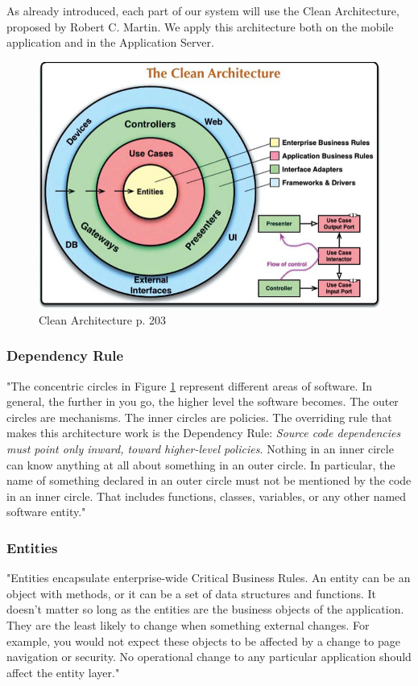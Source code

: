 As already introduced, each part of our system will use the Clean Architecture, proposed by Robert C. Martin. We apply this architecture both on the mobile application and in the Application Server.

\begin{figure}[H]
\centering
\includegraphics[width=.7\textwidth]{Images/cleanArchi.pdf}
\caption{\label{fig:cleanArchi} Clean Architecture \cite{clean} p. 203}
\end{figure}

\subsubsection{Dependency Rule}
"The concentric circles in Figure \ref{fig:cleanArchi} represent different areas of software. In general, the further in you go, the higher level the software becomes. The outer circles are mechanisms. The inner circles are policies.
The overriding rule that makes this architecture work is the Dependency Rule:
\textit{Source code dependencies must point only inward, toward higher-level policies.}
Nothing in an inner circle can know anything at all about something in an outer circle. In particular, the name of something declared in an outer circle must not be mentioned by the code in an inner circle. That includes functions, classes, variables, or any other named software entity." \cite{clean}

\subsubsection{Entities}
"Entities encapsulate enterprise-wide Critical Business Rules. An entity can be an object with methods, or it can be a set of data structures and functions. It doesn’t matter so long as the entities are the business objects of the application. They are the least likely to change when something external changes. For example, you would not expect these objects to be affected by a change to page navigation or security. No operational change to any particular application should affect the entity layer." \cite{clean}


